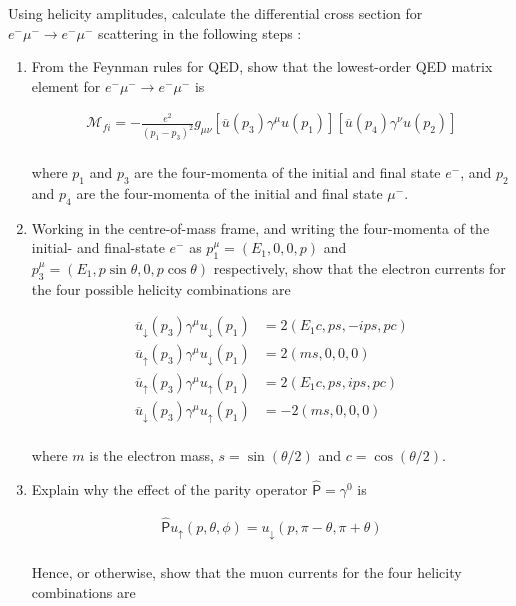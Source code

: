 
\begin{problem}{6.7}
    Using helicity amplitudes, calculate the differential cross section for $e^-\mu^- \to e^-\mu^-$ scattering in the following
    steps :

    \begin{enumerate}[label=(\alph*)]
        \item From the Feynman rules for QED, show that the lowest-order QED matrix element for $e^-\mu^- \to e^-\mu^-$ is 
        
        \begin{align*}
            \mathcal{M}_{fi} = -\frac{e^2}{\left(p_1-p_3\right)^2} g_{\mu\nu} \left[\overbar{u}(p_3)\gamma^\mu u(p_1)\right]\left[\overbar{u}(p_4)\gamma^\nu u(p_2)\right]
        \end{align*}\\
        where $p_1$ and $p_3$ are the four-momenta of the initial and final state $e^-$, and $p_2$ and $p_4$ are the four-momenta of the initial and final state $\mu^-$.

        \item Working in the centre-of-mass frame, and writing the four-momenta of the initial- and final-state $e^-$ as $p_1^\mu = (E_1,0,0,p)$ 
        and $p_3^\mu = (E_1,p\sin\theta,0,p\cos\theta)$ respectively, show that the electron currents for the four possible helicity combinations are

        \begin{align*}
            \overbar{u}_\downarrow(p_3)\gamma^\mu u_\downarrow(p_1) &= 2 (E_1 c , ps,-ips, pc) \\
            \overbar{u}_\uparrow(p_3)\gamma^\mu u_\downarrow(p_1)   &= 2 (ms,0,0,0) \\
            \overbar{u}_\uparrow(p_3)\gamma^\mu u_\uparrow(p_1) &= 2 (E_1 c, ps ,ips,pc) \\
            \overbar{u}_\downarrow(p_3)\gamma^\mu u_\uparrow(p_1) &= -2 (ms,0,0,0)
        \end{align*}\\
        where $m$ is the electron mass, $s=\sin(\theta/2)$ and $c=\cos(\theta/2)$.

        \item Explain why the effect of the parity operator $\hat{\mathsf{P}}=\gamma^0$ is 
        
        \begin{align*}
            \hat{\mathsf{P}} u_\uparrow (p,\theta,\phi) =   u_\downarrow (p,\pi-\theta,\pi+\theta)
        \end{align*}\\
        Hence, or otherwise, show that the muon currents for the four helicity combinations are


\end{enumerate}
\end{problem}
